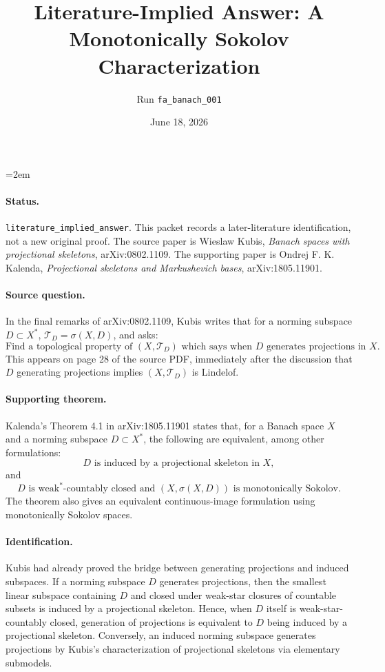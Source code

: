 \documentclass[11pt]{article}
\title{Literature-Implied Answer: A Monotonically Sokolov Characterization}
\author{Run \texttt{fa\_banach\_001}}
\date{June 18, 2026}
\newcommand{\Tau}{\mathcal T}
\begin{document}
\emergencystretch=2em
\maketitle

\paragraph{Status.}
\texttt{literature\_implied\_answer}.  This packet records a later-literature
identification, not a new original proof.  The source paper is Wieslaw Kubis,
\emph{Banach spaces with projectional skeletons}, arXiv:0802.1109.  The
supporting paper is Ondrej F. K. Kalenda, \emph{Projectional skeletons and
Markushevich bases}, arXiv:1805.11901.

\paragraph{Source question.}
In the final remarks of arXiv:0802.1109, Kubis writes that for a norming
subspace \(D\subset X^*\), \(\Tau_D=\sigma(X,D)\), and asks:
\[
  \text{Find a topological property of } (X,\Tau_D)
  \text{ which says when } D \text{ generates projections in } X.
\]
This appears on page 28 of the source PDF, immediately after the discussion
that \(D\) generating projections implies \((X,\Tau_D)\) is Lindelof.

\paragraph{Supporting theorem.}
Kalenda's Theorem 4.1 in arXiv:1805.11901 states that, for a Banach space
\(X\) and a norming subspace \(D\subset X^*\), the following are equivalent,
among other formulations:
\[
  D \text{ is induced by a projectional skeleton in } X,
\]
and
\[
  D \text{ is weak}^{*}\text{-countably closed and }
  (X,\sigma(X,D)) \text{ is monotonically Sokolov}.
\]
The theorem also gives an equivalent continuous-image formulation using
monotonically Sokolov spaces.

\paragraph{Identification.}
Kubis had already proved the bridge between generating projections and induced
subspaces.  If a norming subspace \(D\) generates projections, then the
smallest linear subspace containing \(D\) and closed under weak-star closures
of countable subsets is induced by a projectional skeleton.  Hence, when
\(D\) itself is weak-star-countably closed, generation of projections is
equivalent to \(D\) being induced by a projectional skeleton.  Conversely, an
induced norming subspace generates projections by Kubis's characterization of
projectional skeletons via elementary submodels.
\end{document}

